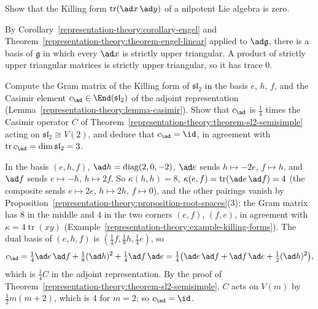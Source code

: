 \begin{exercise}\label{representation-theory:exercise-killing-form-nilpotent}
Show that the Killing form $\operatorname{tr}(\ad x\,\ad y)$ of a nilpotent Lie algebra is zero.
\end{exercise}

\begin{solution}
By Corollary~\ref{representation-theory:corollary-engel} and Theorem~\ref{representation-theory:theorem-engel-linear} applied to $\ad\mathfrak{g}$, there is a basis of
$\mathfrak{g}$ in which every $\ad x$ is strictly upper triangular. A product of strictly upper triangular matrices is strictly upper triangular, so it has trace $0$.
\end{solution}

\begin{exercise}\label{representation-theory:exercise-casimir-sl2}
Compute the Gram matrix of the Killing form of $\mathfrak{sl}_2$ in the basis $e$, $h$, $f$, and the Casimir element $c_{\ad} \in \End(\mathfrak{sl}_2)$ of the adjoint
representation (Lemma~\ref{representation-theory:lemma-casimir}). Show that $c_{\ad}$ is $\frac14$ times the Casimir operator $C$ of Theorem~\ref{representation-theory:theorem-sl2-semisimple}
acting on $\mathfrak{sl}_2 \cong V(2)$, and deduce that $c_{\ad} = \id$, in agreement with $\operatorname{tr}c_{\ad} = \dim\mathfrak{sl}_2 = 3$.
\end{exercise}

\begin{solution}
In the basis $(e, h, f)$, $\ad h = \operatorname{diag}(2, 0, -2)$, $\ad e$ sends $h \mapsto -2e$, $f \mapsto h$, and $\ad f$ sends $e \mapsto -h$, $h \mapsto 2f$. So
$\kappa(h, h) = 8$, $\kappa(e, f) = \operatorname{tr}(\ad e\,\ad f) = 4$ (the composite sends $e \mapsto 2e$, $h \mapsto 2h$, $f \mapsto 0$), and the other pairings vanish by
Proposition~\ref{representation-theory:proposition-root-spaces}(3); the Gram matrix has $8$ in the middle and $4$ in the two corners $(e, f)$, $(f, e)$, in agreement with
$\kappa = 4\operatorname{tr}(xy)$ (Example~\ref{representation-theory:example-killing-forms}). The dual basis of $(e, h, f)$ is $(\frac14f, \frac18h, \frac14e)$, so
\[
c_{\ad} = \tfrac14\ad e\,\ad f + \tfrac18(\ad h)^2 + \tfrac14\ad f\,\ad e = \tfrac14\bigl(\ad e\,\ad f + \ad f\,\ad e + \tfrac12(\ad h)^2\bigr),
\]
which is $\frac14C$ in the adjoint representation. By the proof of Theorem~\ref{representation-theory:theorem-sl2-semisimple}, $C$ acts on $V(m)$ by $\frac12m(m + 2)$, which is $4$ for
$m = 2$; so $c_{\ad} = \id$.
\end{solution}

